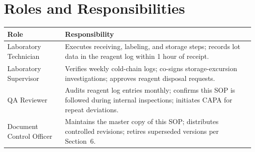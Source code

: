 \section{Roles and Responsibilities}

\begin{tcolorbox}[
    enhanced, breakable, colback=paperwhite, colframe=inkblue!80,
    boxrule=0.6pt, arc=2pt, left=8pt, right=8pt, top=6pt, bottom=6pt
  ]
  \begin{tabularx}{\linewidth}{@{} l >{\RaggedRight}X @{}}
    \toprule
    \textbf{\color{inkblue}Role} & \textbf{\color{inkblue}Responsibility} \\
    \midrule
    Laboratory Technician &
      Executes receiving, labeling, and storage steps; records lot data in the reagent
      log within 1 hour of receipt. \\
    \addlinespace
    Laboratory Supervisor &
      Verifies weekly cold-chain logs; co-signs storage-excursion investigations;
      approves reagent disposal requests. \\
    \addlinespace
    QA Reviewer &
      Audits reagent log entries monthly; confirms this SOP is followed during internal
      inspections; initiates CAPA for repeat deviations. \\
    \addlinespace
    Document Control Officer &
      Maintains the master copy of this SOP; distributes controlled revisions; retires
      superseded versions per Section~6. \\
    \bottomrule
  \end{tabularx}
\end{tcolorbox}

